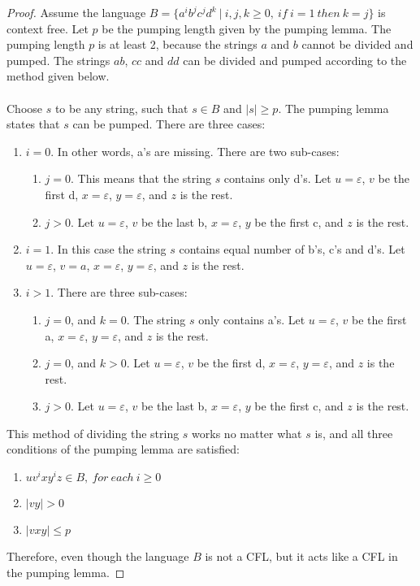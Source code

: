 \documentclass[11pt]{article}
\begin{document}
\begin{proof}
Assume the language $B = \{a^ib^jc^jd^k \ | \ i,j,k \geq 0, \ if \ i = 1 \ then \ k = j \}$ is context free. Let $p$ be the pumping length given by the pumping lemma. The pumping length $p$ is at least 2, because the strings $a$ and $b$ cannot be divided and pumped. The strings $ab$, $cc$ and $dd$ can be divided and pumped according to the method given below.
\\
\\
Choose $s$ to be any string, such that $s \in B$ and $|s| \geq p$. The pumping lemma states that $s$ can be pumped. There are three cases:

\begin{enumerate}
\item $i = 0$. In other words, a's are missing. There are two sub-cases:
\begin{enumerate}
\item $j = 0$. This means that the string $s$ contains only d's. Let $u = \varepsilon$, $v$ be the first d, $x = \varepsilon$, $y = \varepsilon$, and $z$ is the rest.
\item $j > 0$. Let $u = \varepsilon$, $v$ be the last b, $x = \varepsilon$, $y$ be the first c,  and $z$ is the rest.
\end{enumerate}
\item $i = 1$. In this case the string $s$ contains equal number of b's, c's and d's. Let $u = \varepsilon$, $v = a$, $x = \varepsilon$, $y = \varepsilon$, and $z$ is the rest.
\item $i > 1$. There are three sub-cases:
\begin{enumerate}
\item $j = 0$, and $k = 0$. The string $s$ only contains a's. Let $u = \varepsilon$, $v$ be the first a, $x = \varepsilon$, $y = \varepsilon$, and $z$ is the rest.
\item $j = 0$, and $k > 0$. Let $u = \varepsilon$, $v$ be the first d, $x = \varepsilon$, $y = \varepsilon$, and $z$ is the rest.
\item $j > 0$. Let $u = \varepsilon$, $v$ be the last b, $x = \varepsilon$, $y$ be the first c,  and $z$ is the rest.
\end{enumerate}
\end{enumerate}

This method of dividing the string $s$ works no matter what $s$ is, and all three conditions of the pumping lemma are satisfied:
\begin{enumerate}
\item $uv^ixy^iz \in B, \ for \ each \ i \geq 0$
\item $|vy| > 0$
\item $|vxy| \leq p$
\end{enumerate}

Therefore, even though the language $B$ is not a CFL, but it acts like a CFL in the pumping lemma.
\end{proof}
\end{document}
